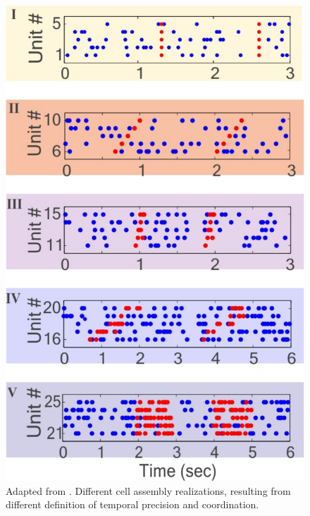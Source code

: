 \begin{framed}
\begin{figure}[H]
    \includegraphics[scale=0.21]{figures/CellAssembliesZoom.pdf}
    \caption{Adapted from \cite{RussoDurstewitz}. Different cell assembly realizations, resulting from different definition of temporal precision and coordination.}
    \label{fig:CellAsseDet}
\end{figure}

\end{framed}

